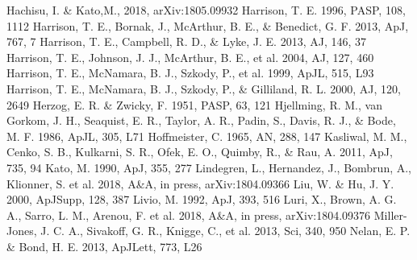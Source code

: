 \documentclass[a4paper,fleqn,usenatbib]{mnras}
\begin{document}
\begin{thebibliography}{99}
 Hachisu, I. \& Kato,M., 2018, arXiv:1805.09932
 Harrison, T. E.  1996, PASP, 108, 1112
 Harrison, T. E., Bornak, J.,  McArthur, B. E., \& Benedict, G. F. 2013, ApJ, 767, 7
 Harrison, T. E., Campbell, R. D., \& Lyke, J. E. 2013, AJ, 146, 37
 Harrison, T. E., Johnson, J. J., McArthur, B. E., et al. 2004, AJ, 127, 460
 Harrison, T. E., McNamara, B. J., Szkody, P., et al. 1999, ApJL, 515, L93
 Harrison, T. E., McNamara, B. J., Szkody, P., \& Gilliland, R. L. 2000, AJ, 120, 2649
 Herzog, E. R. \& Zwicky, F.  1951, PASP, 63, 121
 Hjellming, R. M., van Gorkom, J. H., Seaquist, E. R., Taylor, A. R., Padin, S., Davis, R. J., \& Bode, M. F. 1986, ApJL, 305, L71
 Hoffmeister, C.  1965, AN, 288, 147
 Kasliwal, M. M., Cenko, S. B., Kulkarni, S. R., Ofek, E. O., Quimby, R., \& Rau, A.  2011, ApJ, 735, 94
 Kato, M. 1990, ApJ, 355, 277
 Lindegren, L., Hernandez, J., Bombrun, A., Klionner, S. et al. 2018, A\&A, in press, arXiv:1804.09366
 Liu, W. \& Hu, J. Y.  2000, ApJSupp, 128, 387
 Livio, M. 1992, ApJ, 393, 516
 Luri, X., Brown, A. G. A., Sarro, L. M., Arenou, F. et al. 2018, A\&A, in press, arXiv:1804.09376
 Miller-Jones, J. C. A., Sivakoff, G. R., Knigge, C., et al. 2013, Sci, 340, 950
 Nelan, E. P. \& Bond, H. E. 2013, ApJLett, 773, L26

\end{thebibliography}
\end{document}
